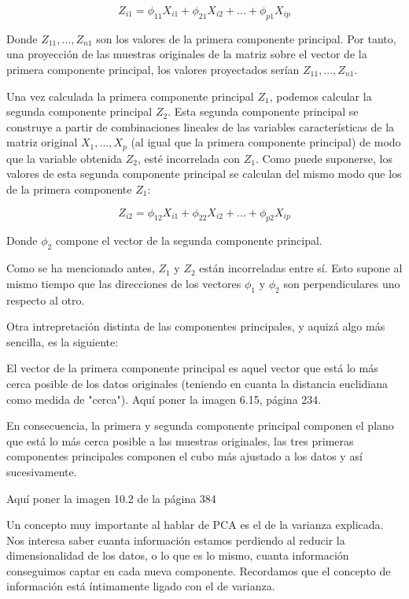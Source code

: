 \documentclass[12pt,a4paper,Spanish]{book}
\begin{document}
\begin{equation}
Z_{i1}=\phi_{11}X_{i1} + \phi_{21}X_{i2} + ... + \phi_{p1}X_{ip}
\end{equation}

Donde $Z_{11},...,Z_{n1}$ son los valores de la primera componente principal. Por tanto, una proyección de las muestras originales de la matriz sobre el vector de la primera componente principal, los valores proyectados serían $Z_{11},...,Z_{n1}$. 

Una vez calculada la primera componente principal $Z_1$, podemos calcular la segunda componente principal $Z_2$. Esta segunda componente principal se construye a partir de combinaciones lineales de las variables características de la matriz original $X_1,...,X_p$ (al igual que la primera componente principal) de modo que la variable obtenida $Z_2$, esté incorrelada con $Z_1$. Como puede suponerse, los valores de esta segunda componente principal se calculan del mismo modo que los de la primera componente $Z_1$:

\begin{equation}
Z_{i2}=\phi_{12}X_{i1} + \phi_{22}X_{i2} + ... + \phi_{p2}X_{ip}
\end{equation}

Donde $\phi_{2}$ compone el vector de la segunda componente principal.

Como se ha mencionado antes, $Z_1$ y $Z_2$ están incorreladas entre sí. Esto supone al mismo tiempo que las direcciones de los vectores $\phi_{1}$ y $\phi_{2}$ son perpendiculares uno respecto al otro.

Otra intrepretación distinta de las componentes principales, y aquizá algo más sencilla, es la siguiente:

El vector de la primera componente principal es aquel vector que está lo más cerca posible de los datos originales (teniendo en cuanta la distancia euclidiana como medida de "cerca"). Aquí poner la imagen 6.15, página 234.

En consecuencia, la primera y segunda componente principal componen el plano que está lo más cerca posible a las muestras originales, las tres primeras componentes principales componen el cubo más ajustado a los datos y así sucesivamente.

Aquí poner la imagen 10.2 de la página 384


Un concepto muy importante al hablar de PCA es el de la varianza explicada. Nos interesa saber cuanta información estamos perdiendo al reducir la dimensionalidad de los datos, o lo que es lo mismo, cuanta información conseguimos captar en cada nueva componente. Recordamos que el concepto de información está íntimamente ligado con el de varianza.
\end{document}
